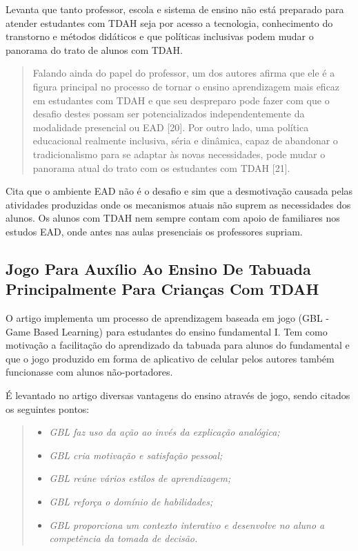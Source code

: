 Levanta que tanto professor, escola e sistema de ensino não está preparado para atender estudantes com TDAH seja por acesso a tecnologia, conhecimento do transtorno e métodos didáticos e que políticas inclusivas podem mudar o panorama do trato de alunos com TDAH. 

\begin{quote}
Falando ainda do papel do professor, um dos autores afirma que ele é a figura principal no processo de tornar o ensino aprendizagem mais eficaz em estudantes com TDAH e que seu despreparo pode fazer com que o desafio destes possam ser potencializados independentemente da modalidade presencial ou EAD [20]. Por outro lado, uma política educacional realmente inclusiva, séria e dinâmica, capaz de abandonar o tradicionalismo para se adaptar às novas necessidades, pode mudar o panorama atual do trato com os estudantes com TDAH [21].
\end{quote}

Cita que o ambiente EAD não é o desafio e sim que a desmotivação causada pelas atividades produzidas onde os mecanismos atuais não suprem as necessidades dos alunos. Os alunos com TDAH nem sempre contam com apoio de familiares nos estudos EAD, onde antes nas aulas presenciais os professores supriam. 


\subsection{Jogo Para Auxílio Ao Ensino De Tabuada Principalmente Para Crianças Com TDAH}

O artigo\cite{sanchez} implementa um processo de aprendizagem baseada em jogo (GBL - Game Based Learning) para estudantes do ensino fundamental I. Tem como motivação a facilitação do aprendizado da tabuada para alunos do fundamental e que o jogo produzido em forma de aplicativo de celular pelos autores também funcionasse com alunos não-portadores.

É levantado no artigo diversas vantagens do ensino através de jogo, sendo citados os seguintes pontos:

\begin{quote}
\begin{itemize}
\item \textit{GBL faz uso da ação ao invés da explicação analógica;}
\item \textit{GBL cria motivação e satisfação pessoal;}
\item \textit{GBL reúne vários estilos de aprendizagem;}
\item \textit{GBL reforça o domínio de habilidades;}
\item \textit{GBL proporciona um contexto interativo e desenvolve no aluno a competência da tomada de decisão.}
\end{itemize}
\end{quote}

